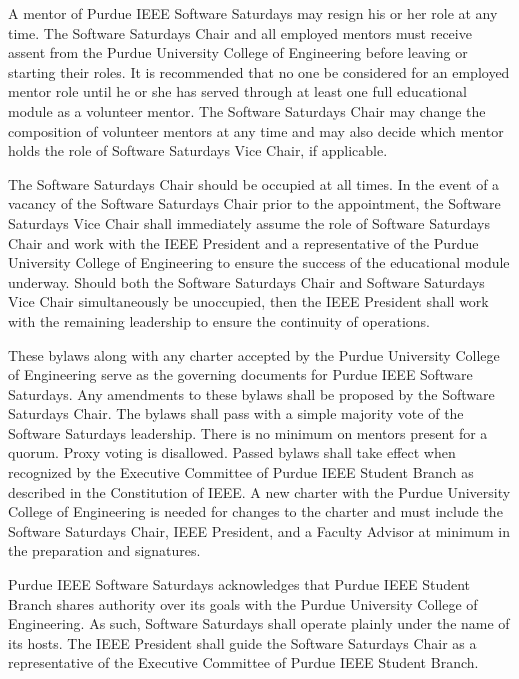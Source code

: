 \documentclass[12pt]{constitution}
\begin{document}
A mentor of Purdue IEEE Software Saturdays may resign his or her role at any time. The Software Saturdays Chair and all employed mentors must receive assent from the Purdue University College of Engineering before leaving or starting their roles. It is recommended that no one be considered for an employed mentor role until he or she has served through at least one full educational module as a volunteer mentor. The Software Saturdays Chair may change the composition of volunteer mentors at any time and may also decide which mentor holds the role of Software Saturdays Vice Chair, if applicable.

The Software Saturdays Chair should be occupied at all times. In the event of a vacancy of the Software Saturdays Chair prior to the appointment, the Software Saturdays Vice Chair shall immediately assume the role of Software Saturdays Chair and work with the IEEE President and a representative of the Purdue University College of Engineering to ensure the success of the educational module underway. Should both the Software Saturdays Chair and Software Saturdays Vice Chair simultaneously be unoccupied, then the IEEE President shall work with the remaining leadership to ensure the continuity of operations.


\label{art:govern}

These bylaws along with any charter accepted by the Purdue University College of Engineering serve as the governing documents for Purdue IEEE Software Saturdays. Any amendments to these bylaws shall be proposed by the Software Saturdays Chair. The bylaws shall pass with a simple majority vote of the Software Saturdays leadership. There is no minimum on mentors present for a quorum. Proxy voting is disallowed. Passed bylaws shall take effect when recognized by the Executive Committee of Purdue IEEE Student Branch as described in the Constitution of IEEE. A new charter with the Purdue University College of Engineering is needed for changes to the charter and must include the Software Saturdays Chair, IEEE President, and a Faculty Advisor at minimum in the preparation and signatures.


\label{art:authority}

Purdue IEEE Software Saturdays acknowledges that Purdue IEEE Student Branch shares authority over its goals with the Purdue University College of Engineering. As such, Software Saturdays shall operate plainly under the name of its hosts. The IEEE President shall guide the Software Saturdays Chair as a representative of the Executive Committee of Purdue IEEE Student Branch.
\end{document}
